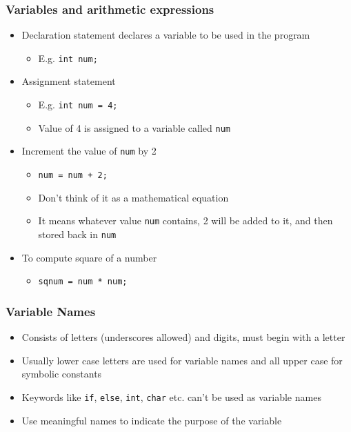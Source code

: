 \documentclass[11pt]{beamer}
\begin{document}
\begin{frame}[fragile]\frametitle{Variables and arithmetic expressions}
\label{sec-1-8}

\begin{itemize}
\item Declaration statement declares a variable to be used in the program
\begin{itemize}
\item E.g. \verb~int num;~
\end{itemize}
\item Assignment statement
\begin{itemize}
\item E.g. \verb~int num = 4;~
\item Value of 4 is assigned to a variable called \verb~num~
\end{itemize}
\item Increment the value of \verb~num~ by 2
\begin{itemize}
\item \verb~num = num + 2;~
\item Don't think of it as a mathematical equation
\item It means whatever value \verb~num~ contains, 2 will be added to it, and then stored back in \verb~num~
\end{itemize}
\end{itemize}
\begin{itemize}
\item To compute square of a number
\begin{itemize}
\item \verb~sqnum = num * num;~
\end{itemize}
\end{itemize}
\end{frame}
\begin{frame}[fragile]\frametitle{Variable Names}
\label{sec-1-9}

\begin{itemize}
\item Consists of letters (underscores allowed) and digits, must begin with a letter
\item Usually lower case letters are used for variable names and all upper case for symbolic constants
\item Keywords like \verb~if~, \verb~else~, \verb~int~, \verb~char~ etc. can't be used as variable names
\item Use meaningful names to indicate the purpose of the variable
\end{itemize}
\end{frame}
\end{document}

